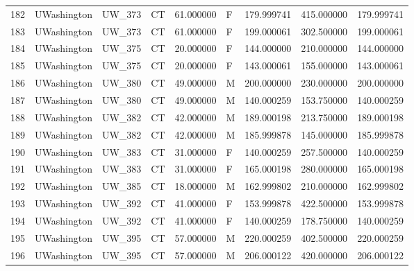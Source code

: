 \begin{tabular}{llllrlrrr}
182    &     UWashington &       UW\_373 &                 CT &  61.000000 &        F &       179.999741 &    415.000000 &  179.999741 \\
183    &     UWashington &       UW\_373 &                 CT &  61.000000 &        F &       199.000061 &    302.500000 &  199.000061 \\
184    &     UWashington &       UW\_375 &                 CT &  20.000000 &        F &       144.000000 &    210.000000 &  144.000000 \\
185    &     UWashington &       UW\_375 &                 CT &  20.000000 &        F &       143.000061 &    155.000000 &  143.000061 \\
186    &     UWashington &       UW\_380 &                 CT &  49.000000 &        M &       200.000000 &    230.000000 &  200.000000 \\
187    &     UWashington &       UW\_380 &                 CT &  49.000000 &        M &       140.000259 &    153.750000 &  140.000259 \\
188    &     UWashington &       UW\_382 &                 CT &  42.000000 &        M &       189.000198 &    213.750000 &  189.000198 \\
189    &     UWashington &       UW\_382 &                 CT &  42.000000 &        M &       185.999878 &    145.000000 &  185.999878 \\
190    &     UWashington &       UW\_383 &                 CT &  31.000000 &        F &       140.000259 &    257.500000 &  140.000259 \\
191    &     UWashington &       UW\_383 &                 CT &  31.000000 &        F &       165.000198 &    280.000000 &  165.000198 \\
192    &     UWashington &       UW\_385 &                 CT &  18.000000 &        M &       162.999802 &    210.000000 &  162.999802 \\
193    &     UWashington &       UW\_392 &                 CT &  41.000000 &        F &       153.999878 &    422.500000 &  153.999878 \\
194    &     UWashington &       UW\_392 &                 CT &  41.000000 &        F &       140.000259 &    178.750000 &  140.000259 \\
195    &     UWashington &       UW\_395 &                 CT &  57.000000 &        M &       220.000259 &    402.500000 &  220.000259 \\
196    &     UWashington &       UW\_395 &                 CT &  57.000000 &        M &       206.000122 &    420.000000 &  206.000122 \\

\end{tabular}
